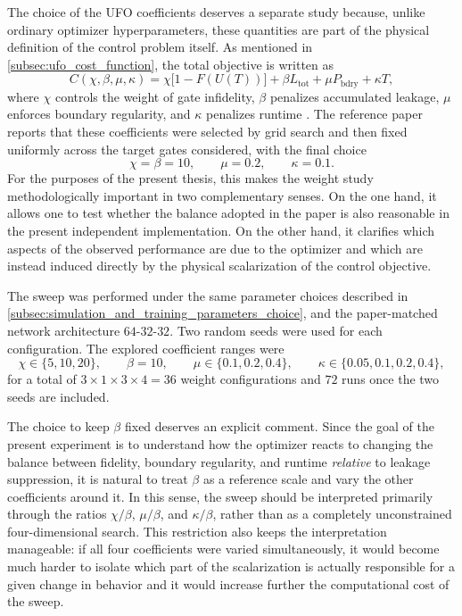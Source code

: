 The choice of the UFO coefficients deserves a separate study because, unlike ordinary optimizer hyperparameters, these quantities are part of the physical definition of the control problem itself. As mentioned in \ref{subsec:ufo_cost_function}, the total objective is written as
\begin{equation}
    C(\chi,\beta,\mu,\kappa)
    =
\chi\bigl[1-F(U(T))\bigr]
+
\beta L_{\mathrm{tot}}
+
\mu P_{\mathrm{bdry}}
+
\kappa T,
\label{eq:ufo_cost_recalled_weight_sweep}
\end{equation}
where \(\chi\) controls the weight of gate infidelity, \(\beta\) penalizes accumulated leakage, \(\mu\) enforces boundary regularity, and \(\kappa\) penalizes runtime \cite{Niu2019}. The reference paper reports that these coefficients were selected by grid search and then fixed uniformly across the target gates considered, with the final choice
\begin{equation}
    \chi=\beta=10,
    \qquad
    \mu=0.2,
    \qquad
    \kappa=0.1.
    \label{eq:paper_ufo_weights_recalled}
\end{equation}
For the purposes of the present thesis, this makes the weight study methodologically important in two complementary senses. On the one hand, it allows one to test whether the balance adopted in the paper is also reasonable in the present independent implementation. On the other hand, it clarifies which aspects of the observed performance are due to the optimizer and which are instead induced directly by the physical scalarization of the control objective.


The sweep was performed under the same parameter choices described in \ref{subsec:simulation_and_training_parameters_choice}, and the paper-matched network architecture \(64\text{-}32\text{-}32\). Two random seeds were used for each configuration. The explored coefficient ranges were
\begin{equation}
    \chi \in \{5,10,20\},
    \qquad
\beta = 10,
\qquad
\mu \in \{0.1,0.2,0.4\},
\qquad
\kappa \in \{0.05,0.1,0.2,0.4\},
\label{eq:ufo_weight_sweep_ranges}
\end{equation}
for a total of \(3\times 1\times 3\times 4 = 36\) weight configurations and \(72\) runs once the two seeds are included.

The choice to keep \(\beta\) fixed deserves an explicit comment. Since the goal of the present experiment is to understand how the optimizer reacts to changing the balance between fidelity, boundary regularity, and runtime \emph{relative} to leakage suppression, it is natural to treat \(\beta\) as a reference scale and vary the other coefficients around it. In this sense, the sweep should be interpreted primarily through the ratios \(\chi/\beta\), \(\mu/\beta\), and \(\kappa/\beta\), rather than as a completely unconstrained four-dimensional search. This restriction also keeps the interpretation manageable: if all four coefficients were varied simultaneously, it would become much harder to isolate which part of the scalarization is actually responsible for a given change in behavior and it would increase further the computational cost of the sweep.

